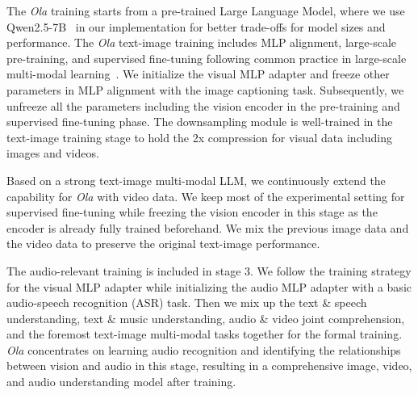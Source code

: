 The \textit{Ola} training starts from a pre-trained Large Language Model, where we use Qwen2.5-7B~\citep{qwen2.5} in our implementation for better trade-offs for model sizes and performance. The \textit{Ola} text-image training includes MLP alignment, large-scale pre-training, and supervised fine-tuning following common practice in large-scale multi-modal learning~\citep{tong2024cambrian,li2024llavaov}. We initialize the visual MLP adapter and freeze other parameters in MLP alignment with the image captioning task. Subsequently, we unfreeze all the parameters including the vision encoder in the pre-training and supervised fine-tuning phase. The downsampling module is well-trained in the text-image training stage to hold the 2x compression for visual data including images and videos.

Based on a strong text-image multi-modal LLM, we continuously extend the capability for \textit{Ola} with video data. We keep most of the experimental setting for supervised fine-tuning while freezing the vision encoder in this stage as the encoder is already fully trained beforehand. We mix the previous image data and the video data to preserve the original text-image performance. 

The audio-relevant training is included in stage 3. We follow the training strategy for the visual MLP adapter while initializing the audio MLP adapter with a basic audio-speech recognition (ASR) task. Then we mix up the text \& speech understanding, text \& music understanding, audio \& video joint comprehension, and the foremost text-image multi-modal tasks together for the formal training. \textit{Ola} concentrates on learning audio recognition and identifying the relationships between vision and audio in this stage, resulting in a comprehensive image, video, and audio understanding model after training. 



